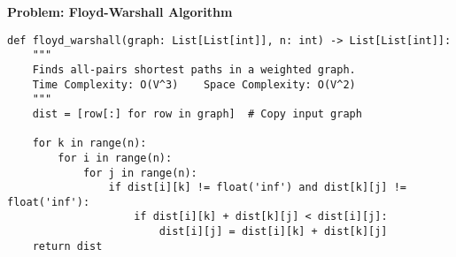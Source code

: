 \noindent\textbf{Problem: Floyd-Warshall Algorithm}
\begin{verbatim}
def floyd_warshall(graph: List[List[int]], n: int) -> List[List[int]]:
    """
    Finds all-pairs shortest paths in a weighted graph.
    Time Complexity: O(V^3)    Space Complexity: O(V^2)
    """
    dist = [row[:] for row in graph]  # Copy input graph
    
    for k in range(n):
        for i in range(n):
            for j in range(n):
                if dist[i][k] != float('inf') and dist[k][j] != float('inf'):
                    if dist[i][k] + dist[k][j] < dist[i][j]:
                        dist[i][j] = dist[i][k] + dist[k][j]
    return dist
\end{verbatim}

